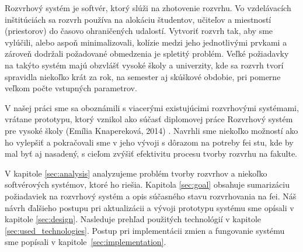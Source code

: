 Rozvrhový systém je softvér, ktorý slúži na zhotovenie rozvrhu. Vo vzdelávacích
inštitúciách sa rozvrh používa na alokáciu študentov, učiteľov a miestností
(priestorov) do časovo ohraničených udalostí. Vytvoriť rozvrh tak, aby sme
vylúčili, alebo aspoň minimalizovali, kolízie medzi jeho jednotlivými prvkami a
zároveň dodržali požadované obmedzenia je spletitý problém. Veľké požiadavky na
takýto systém majú obzvlášť vysoké školy a univerzity, kde sa rozvrh tvorí
spravidla niekoľko krát za rok, na semester aj skúškové obdobie, pri pomerne
veľkom počte vstupných parametrov.

V našej práci sme sa oboznámili s viacerými existujúcimi rozvrhovými systémami,
vrátane prototypu, ktorý vznikol ako súčasť diplomovej práce Rozvrhový systém
pre vysoké školy (Emília Knapereková, 2014) \cite{knap}. Navrhli sme niekoľko
možností ako ho vylepšiť a pokračovali sme v jeho vývoji s dôrazom na potreby
\acrshort{fei} \acrshort{stu}, kde by mal byť aj nasadený, s cieľom zvýšiť
efektivitu procesu tvorby rozvrhu na fakulte.

V kapitole \ref{sec:analysis} analyzujeme problém tvorby rozvrhov a niekoľko
softvérových systémov, ktoré ho riešia. Kapitola \ref{sec:goal} obsahuje
sumarizáciu požiadaviek na rozvrhový systém a opis súčasného stavu rozvrhovania
na \acrshort{fei}. Náš návrh ďalšieho postupu pri aktualizácii a vývoji
prototypu systému sme opísali v kapitole \ref{sec:design}. Nasleduje prehľad
použitých technológií v kapitole \ref{sec:used_technologies}. Postup pri
implementácii zmien a fungovanie systému sme popísali v
kapitole~\ref{sec:implementation}.

